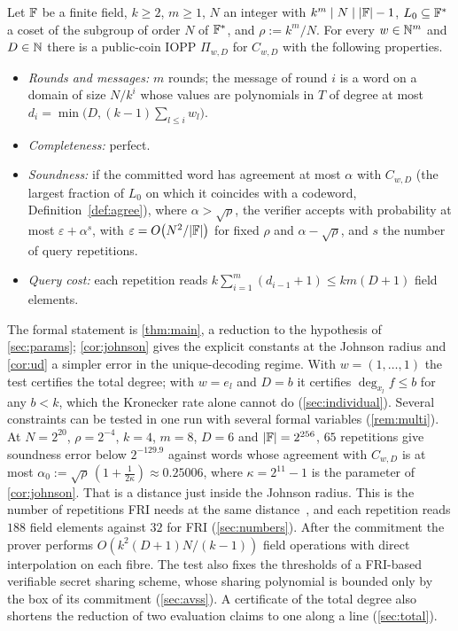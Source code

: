 \begin{introthm}[informal]\label{thm:intro}
Let $\mathbb{F}$ be a finite field, $k\ge2$, $m\ge1$, $N$ an integer with $k^m\mid N\mid|\mathbb{F}|-1$,
$L_0\subseteq\mathbb{F}^*$ a coset of the subgroup of order $N$ of $\mathbb{F}^*$, and $\rho:=k^m/N$. For every $w\in\mathbb{N}^m$ and $D\in\mathbb{N}$ there is a
public-coin IOPP $\Pi_{w,D}$ for $C_{w,D}$ with the following properties.
\begin{itemize}
\item \emph{Rounds and messages:} $m$ rounds; the message of round $i$ is a word on a domain
of size $N/k^i$ whose values are polynomials in $T$ of degree at most
$d_i=\min\big(D,(k-1)\sum_{l\le i}w_l\big)$.
\item \emph{Completeness:} perfect.
\item \emph{Soundness:} if the committed word has agreement at most $\alpha$ with
$C_{w,D}$ (the largest fraction of $L_0$ on which it coincides with a codeword,
Definition~\ref{def:agree}), where $\alpha>\sqrt\rho$, the verifier accepts with probability at most
$\varepsilon+\alpha^s$, with $\varepsilon=O\big(N^2/|\mathbb{F}|\big)$ for fixed $\rho$ and
$\alpha-\sqrt\rho$, and $s$ the number of query repetitions.
\item \emph{Query cost:} each repetition reads $k\sum_{i=1}^m(d_{i-1}+1)\le km(D+1)$ field
elements.
\end{itemize}
\end{introthm}

The formal statement is \cref{thm:main}, a reduction to the hypothesis of \cref{sec:params};
\cref{cor:johnson} gives the explicit constants at the Johnson radius and \cref{cor:ud} a simpler
error in the unique-decoding regime. With $w=(1,\dots,1)$ the test certifies the
total degree; with $w=e_l$ and $D=b$ it certifies $\deg_{x_l}f\le b$ for any $b<k$, which the
Kronecker rate alone cannot do (\cref{sec:individual}). Several constraints can be tested in
one run with several formal variables (\cref{rem:multi}). At $N=2^{20}$, $\rho=2^{-4}$,
$k=4$, $m=8$, $D=6$ and $|\mathbb{F}|=2^{256}$, $65$ repetitions give soundness error below
$2^{-129.9}$ against words whose agreement with $C_{w,D}$ is at most
$\alpha_0:=\sqrt\rho\,(1+\frac1{2\kappa})\approx0.25006$, where $\kappa=2^{11}-1$ is the parameter
of \cref{cor:johnson}. That is a distance just inside the Johnson radius. This is the number of repetitions FRI
needs at the same distance~\cite[\S8.2]{BCIKS20}, and each repetition reads $188$ field
elements against $32$ for FRI (\cref{sec:numbers}). After the commitment the prover performs
$O(k^2(D+1)N/(k-1))$ field operations with direct interpolation on each fibre. The test also
fixes the thresholds of a FRI-based verifiable secret sharing scheme, whose sharing polynomial
is bounded only by the box of its commitment (\cref{sec:avss}). A certificate of the total
degree also shortens the reduction of two evaluation claims to one along a line
(\cref{sec:total}).

